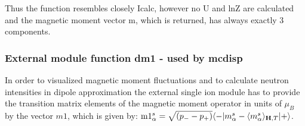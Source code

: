Thus the function resembles closely Icalc, however no U and lnZ are calculated and
the magnetic moment vector m, which is returned, has always exactly 3 components.


\subsubsection{External module function {\prg dm1} - used by {\prg mcdisp}}

In order to visualized magnetic moment fluctuations and to calculate neutron intensities
in dipole approximation the external single ion module has to provide the transition
matrix elements of the magnetic moment operator in units of $\mu_B$ by the
vector $m1$, which is given by:
 ${\rm m1}^s_{\alpha}=\sqrt{(p_--p_+)}\langle -|m^s_{\alpha}-\langle m^s_{\alpha}\rangle_{\mathbf H,T}|+\rangle$. 

